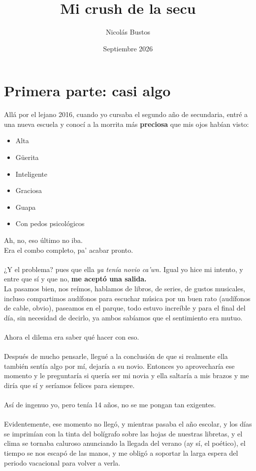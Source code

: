 \documentclass{article}
\title{Mi crush de la secu}
\author{Nicolás Bustos}
\date{Septiembre 2026}
\begin{document}
\maketitle

\section{Primera parte: casi algo}
Allá por el lejano 2016, cuando yo cursaba el segundo año de secundaria, entré a una nueva escuela y conocí a la morrita más \textbf{preciosa} que mis ojos habían visto: 
\begin{itemize}
  \item Alta
  \item Güerita
  \item Inteligente
  \item Graciosa
  \item Guapa
  \item Con pedos psicológicos
\end{itemize}
Ah, no, eso último no iba.
\\Era el combo completo, pa' acabar pronto.
\\
\\¿Y el problema? pues que ella \textit{ya tenía novio ca'wn.} Igual yo hice mi intento, y entre que sí y que no, \textbf{me aceptó una salida.}
\\La pasamos bien, nos reímos, hablamos de libros, de series, de gustos musicales, incluso compartimos audífonos para escuchar música por un buen rato (audífonos de cable, obvio), paseamos en el parque, todo estuvo increíble y para el final del día, sin necesidad de decirlo, ya ambos sabíamos que el sentimiento era mutuo.
\\
\\Ahora el dilema era saber qué hacer con eso. 
\\
\\Después de mucho pensarle, llegué a la conclusión de que si realmente ella también sentía algo por mí, dejaría a su novio. Entonces yo aprovecharía ese momento y le preguntaría si quería ser mi novia y ella saltaría a mis brazos y me diría que sí y seríamos felices para siempre.
\\
\\Así de ingenuo yo, pero tenía 14 años, no se me pongan tan exigentes.
\\
\\Evidentemente, ese momento no llegó, y mientras pasaba el año escolar, y los días se imprimían con la tinta del bolígrafo sobre las hojas de nuestras libretas, y el clima se tornaba caluroso anunciando la llegada del verano (ay sí, el poético), el tiempo se nos escapó de las manos, y me obligó a soportar la larga espera del periodo vacacional para volver a verla.
\end{document}
